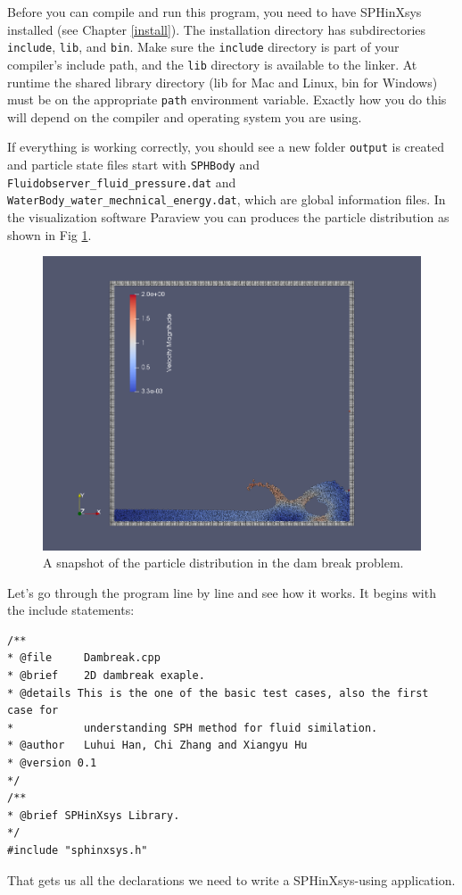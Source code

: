 \documentclass[12pt, a4paper,onecolumn]{article}
\begin{document}
%
Before you can compile and run this program, 
you need to have SPHinXsys installed (see Chapter \ref{install}). 
The installation directory has subdirectories \texttt{include}, \texttt{lib}, and \texttt{bin}. 
Make sure the \texttt{include} directory is part of your compiler’s include path, and the \texttt{lib} directory is available to the linker. At runtime the shared library directory (lib for Mac and Linux, bin for Windows) must be on the appropriate  \texttt{path} environment variable. Exactly how you do this will depend on the compiler and operating system you are using.

If everything is working correctly, 
you should see a new folder \texttt{output} is created and particle state files start with \texttt{SPHBody}
and \texttt{Fluidobserver\_fluid\_pressure.dat} and \texttt{WaterBody\_water\_mechnical\_energy.dat}, 
which are global information files.
In the visualization software Paraview you can produces the particle distribution as shown in Fig \ref{figs:dambreak}. 
%
\begin{figure}[tb!]
	\centering
	\includegraphics[width=\textwidth]{figs/dambreak.png}
	\caption{A snapshot of the particle distribution in the dam break problem.}
	\label{figs:dambreak}
\end{figure}
%
Let’s go through the program line by line and see how it works. 
It begins with the include statements:
%
\begin{lstlisting}[basicstyle=\ttfamily\footnotesize]
/**
* @file 	Dambreak.cpp
* @brief 	2D dambreak exaple.
* @details This is the one of the basic test cases, also the first case for
* 			understanding SPH method for fluid similation.
* @author 	Luhui Han, Chi Zhang and Xiangyu Hu
* @version 0.1
*/
/**
* @brief SPHinXsys Library.
*/
#include "sphinxsys.h"
\end{lstlisting}
%
That gets us all the declarations we need to write a SPHinXsys-using application.
\end{document}
